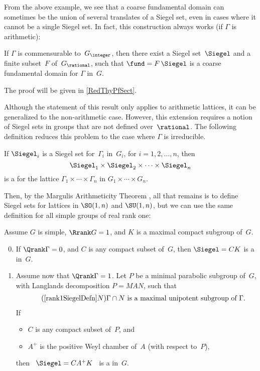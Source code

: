 From the above example, we see that a coarse fundamental domain can sometimes be the union of several translates of a Siegel set, even in cases where it cannot be a single Siegel set.
In fact, this construction always works (if $\Gamma$ is arithmetic):

\begin{namedthm}
\label{ReductThyArithGrps}
If\/ $\Gamma$ is commensurable to~$G_{\integer}$,
then there exist a Siegel set\/~$\Siegel$ and a finite subset~$F$ of~$G_{\rational}$, such that $\fund = F \, \Siegel$ is a coarse fundamental domain for\/ $\Gamma$ in~$G$.
\end{namedthm}

The proof will be given in \cref{RedThyPfSect}.

\medbreak

Although the statement of this result only applies to arithmetic lattices, it can be generalized to the non-arithmetic case. However, this extension requires a notion of Siegel sets in groups that are not defined over~$\rational$. The following definition reduces this problem to the case where $\Gamma$ is irreducible.

\begin{defn}
If $\Siegel_i$ is a Siegel set for~$\Gamma_i$ in~$G_i$, for $i = 1,2,\ldots,n$, then 
	$$ \Siegel_1 \times \Siegel_2 \times \cdots \times \Siegel_n $$ 
is a  for the lattice $\Gamma_1 \times \cdots \times \Gamma_n$ in $G_1 \times \cdots \times G_n$.
\end{defn}

Then, by the Margulis Arithmeticity Theorem , all that remains is to define Siegel sets for lattices in $\SO(1,n)$ and $\SU(1,n)$, but we can use the same definition for all simple groups of real rank one:

\begin{defn} \label{rank1SiegelDefn}
Assume $G$ is simple, $\Rrank G = 1$, and $K$ is a maximal compact subgroup of~$G$.
\noprelistbreak
	\begin{enumerate} \setcounter{enumi}{-1}
	\item If $\Qrank \Gamma = 0$, and $C$ is any compact subset of~$G$, then 
	$ \Siegel = C K $ is a  in~$G$.
	\item Assume now that $\Qrank \Gamma = 1$. Let
		$P$ be a minimal parabolic subgroup of~$G$, with Langlands decomposition $P = MAN$, such that
			\begin{align} \tag{\ref{rank1SiegelDefn}$N$} \label{rank1SiegelDefnN}
			\text{$\Gamma \cap N$ is a maximal unipotent subgroup of~$\Gamma$.}
			\end{align}
If 
	\begin{itemize}
	\item $C$ is any compact subset of~$P$, 
	and 
	\item $A^+$ is the positive Weyl chamber of~$A$ \textup(with respect to~$P$\textup), 
	\end{itemize}
then
	\ $ \Siegel = C A^+ K $ \ 
	is a  in~$G$.
	\end{enumerate}
\end{defn}

